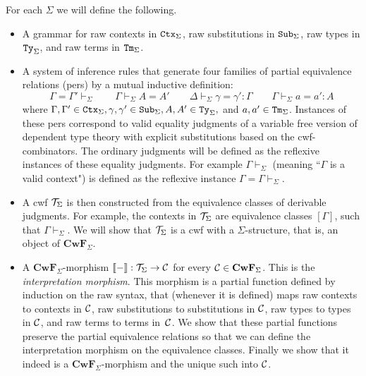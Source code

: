 \documentclass{lmcs}
\def\Cwf{\mathbf{CwF}}
\begin{document}
For each $\Sigma$ we will define the following.
\begin{itemize}
\item
A grammar for raw contexts in ${\tt Ctx}_\Sigma$, raw substitutions in ${\tt Sub}_\Sigma$, raw types in ${\tt Ty}_\Sigma$, and raw terms in ${\tt Tm}_\Sigma$.
\item
A system of inference rules that generate four families of partial equivalence relations (pers) by a mutual inductive definition:
$$
\Gamma = \Gamma' \vdash_\Sigma
\qquad
\Gamma \vdash_\Sigma A = A'
\qquad
\Delta \vdash_\Sigma \gamma = \gamma' : \Gamma
\qquad
\Gamma \vdash_\Sigma a = a' : A
$$
where $\Gamma, \Gamma' \in {\tt Ctx}_\Sigma, \gamma, \gamma' \in {\tt Sub}_\Sigma, A, A' \in {\tt Ty}_\Sigma,$ and $a,a' \in {\tt Tm}_\Sigma$. Instances of these pers correspond to valid equality judgments of a variable free version of dependent type theory with explicit substitutions based on the cwf-combinators. The ordinary judgments will be defined as the reflexive instances of these equality judgments. For example $\Gamma \vdash_\Sigma$ (meaning ``$\Gamma$ is a valid context") is defined as the reflexive instance $\Gamma = \Gamma \vdash_\Sigma$.
\item
A cwf ${\mathcal T}_\Sigma$ is then constructed from the equivalence classes of derivable judgments. For example, the contexts in ${\mathcal T}_\Sigma$ are equivalence classes $[\Gamma]$, such that $\Gamma \vdash_\Sigma$. We will show that ${\mathcal T}_\Sigma$ is a cwf with a $\Sigma$-structure, that is, an object of $\Cwf_\Sigma$.
\item
A $\Cwf_\Sigma$-morphism $\llbracket - \rrbracket : {\mathcal T}_\Sigma \to {\mathcal C}$ for every $\C \in \Cwf_\Sigma$. This is the {\em interpretation morphism}. This morphism is a partial function defined by induction on the raw syntax, that (whenever it is defined) maps raw contexts to contexts in ${\mathcal C}$, raw substitutions to substitutions in ${\mathcal C}$, raw types to types in ${\mathcal C}$, and raw terms to terms in~${\mathcal C}$. We show that these partial functions preserve the partial equivalence relations so that we can define the interpretation morphism on the equivalence classes. Finally we show that it indeed is a $\Cwf_\Sigma$-morphism and the unique such into ${\mathcal C}$.
\end{itemize}
\end{document}
